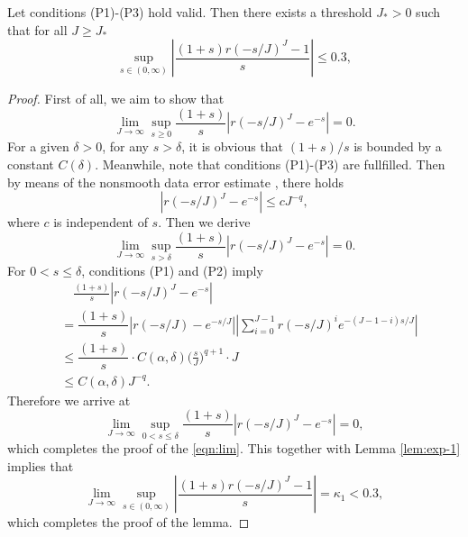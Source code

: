 \begin{theorem}\label{thm:conv-1}
Let conditions (P1)-(P3) hold valid. Then there exists a threshold $J_*>0$ such that
for all $J\ge J_*$
 \begin{equation*}
\sup_{s\in(0,\infty)}  \left|\frac{(1+s) r(-s/J)^J-1}{s}\right| \le 0.3,
\end{equation*}
        \end{theorem}
\begin{proof}
First of all, we aim to show that
 \begin{equation}\label{eqn:lim}
  \lim_{J\rightarrow\infty}\sup_{s\geq0}\frac{(1+s)}{s} \left|r(-s/J)^J-e^{- s}\right|=0.
  \end{equation}
For a given $\delta>0$, for any $s>\delta$,  it is obvious that $(1+s)/s$
is bounded by a constant $C(\delta)$. Meanwhile, note that
conditions (P1)-(P3) are fullfilled.
Then by means of the nonsmooth data error estimate \cite[Theorem 7.2]{Thomee:2006}, there holds
\begin{equation*}
\left|r(-s/J)^J-e^{-  s}\right| \le c J^{-q},
\end{equation*}
where $c$ is independent of $s$.
Then we derive
\begin{equation*}
\lim_{J\rightarrow\infty}\sup_{s> \delta}\frac{(1+s)}{s} \left|r(-s/J)^J-e^{-  s}\right|=0.
\end{equation*}
For $0 < s \leq\delta$, conditions (P1) and (P2) imply
\begin{equation*}
\begin{aligned}
   &\quad \frac{(1+s)}{s}   \left|r(-s/J)^J-e^{-  s}\right| \\
    &= \dfrac{(1+s)}{s}|r(-s/J)-e^{- s/J}|
    \left|\sum_{i=0}^{J-1} r(-s/J)^{i} e^{ -(J-1-i)  s/J}\right| \\
    &\leq \dfrac{(1+s)}{s} \cdot C(\alpha, \delta)\Big(\frac{s}{J}\Big)^{q+1} \cdot J \\
    &\leq C(\alpha, \delta) J^{-q}.
\end{aligned}
\end{equation*}
Therefore we arrive at
$$\lim_{J\to\infty}\sup_{0<s\leq\delta}\frac{(1+s)}{s} \left|r(-s/J)^{J} -e^{- s}\right|=0,$$
which completes the proof of the \eqref{eqn:lim}.
This together with Lemma \ref{lem:exp-1} implies that
    $$\lim_{J\to\infty}\sup_{s\in(0,\infty)}
    \left| \frac{(1+s)r(-s/J)^J-1}{s}  \right| = \kappa_1 < 0.3,$$
which completes the proof of the lemma.
\end{proof}


